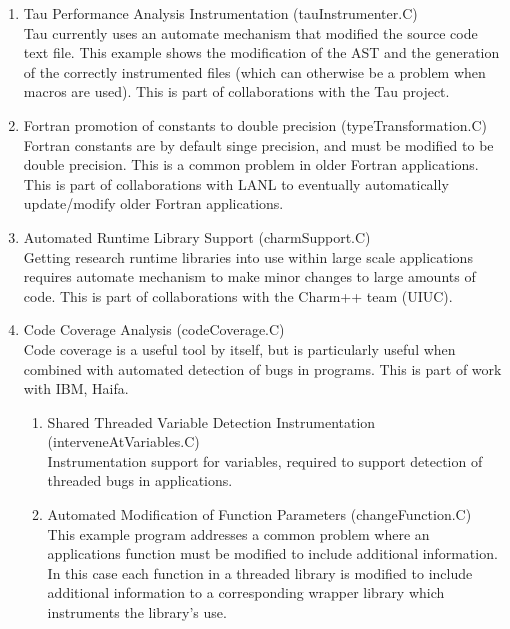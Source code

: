 \begin{enumerate}
     \item Tau Performance Analysis Instrumentation (tauInstrumenter.C) \\
           Tau currently uses an automate mechanism that modified the source code text
           file.  This example shows the modification of the AST and the generation 
           of the correctly instrumented files (which can otherwise be a problem when
           macros are used).  This is part of collaborations with the Tau project.
     \item Fortran promotion of constants to double precision (typeTransformation.C) \\
           Fortran constants are by default singe precision, and must be modified to
           be double precision.  This is a common problem in older Fortran applications.
           This is part of collaborations with LANL to eventually automatically 
           update/modify older Fortran applications.
     \item Automated Runtime Library Support (charmSupport.C) \\
           Getting research runtime libraries into use within large scale applications
           requires automate mechanism to make minor changes to large amounts of code.
           This is part of collaborations with the Charm++ team (UIUC).
     \item Code Coverage Analysis (codeCoverage.C) \\
           Code coverage is a useful tool by itself, but is particularly useful when
           combined with automated detection of bugs in programs.  This is part of
           work with IBM, Haifa.
     \begin{enumerate}
        \item Shared Threaded Variable Detection Instrumentation (interveneAtVariables.C) \\
              Instrumentation support for variables, required to support detection of 
              threaded bugs in applications.
        \item Automated Modification of Function Parameters (changeFunction.C) \\
              This example program addresses a common problem where an applications
              function must be modified to include additional information.  In this
              case each function in a threaded library is modified to include additional 
              information to a corresponding wrapper library which instruments the
              library's use.
     \end{enumerate}
\end{enumerate}




